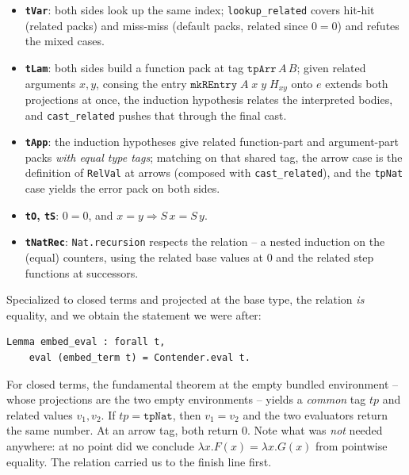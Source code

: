 \documentclass[11pt,a4paper]{article}
\theoremstyle{plain}
\theoremstyle{definition}
\theoremstyle{remark}
\begin{document}
\begin{itemize}[leftmargin=2em]
  \item \textbf{\texttt{tVar}}: both sides look up the same index;
        \texttt{lookup\_related} covers hit-hit (related packs) and
        miss-miss (default packs, related since $0 = 0$)
        and refutes the mixed cases.
  \item \textbf{\texttt{tLam}}: both sides build a function pack at
        tag $\texttt{tpArr}\,A\,B$; given related arguments $x, y$,
        consing the entry $\texttt{mkREntry}\;A\;x\;y\;H_{xy}$ onto
        $e$ extends both projections at once, the induction
        hypothesis relates the interpreted bodies, and
        \texttt{cast\_related} pushes that through the final cast.
  \item \textbf{\texttt{tApp}}: the induction hypotheses give related
        function-part and argument-part packs \emph{with equal type
        tags}; matching on that shared tag, the arrow case is the
        definition of \texttt{RelVal} at arrows (composed with
        \texttt{cast\_related}), and the \texttt{tpNat} case yields
        the error pack on both sides.
  \item \textbf{\texttt{tO}, \texttt{tS}}: $0 = 0$, and $x = y
        \Rightarrow S\,x = S\,y$.
  \item \textbf{\texttt{tNatRec}}: \texttt{Nat.recursion} respects the
        relation -- a nested induction on the (equal) counters, using
        the related base values at $0$ and the related step functions
        at successors.
\end{itemize}

Specialized to closed terms and projected at the base type, the
relation \emph{is} equality, and we obtain the statement we were
after:

\begin{lstlisting}
Lemma embed_eval : forall t,
    eval (embed_term t) = Contender.eval t.
\end{lstlisting}

For closed terms, the fundamental theorem at the empty bundled
environment -- whose projections are the two empty environments --
yields a \emph{common} tag $tp$ and related values $v_1, v_2$.  If $tp = \texttt{tpNat}$, then $v_1 = v_2$ and the two
evaluators return the same number.  At an arrow tag, both return $0$.
Note what was \emph{not} needed anywhere: at no point did we conclude
$\lambda x.F(x) = \lambda x.G(x)$ from pointwise equality.  The
relation carried us to the finish line first.
\end{document}
